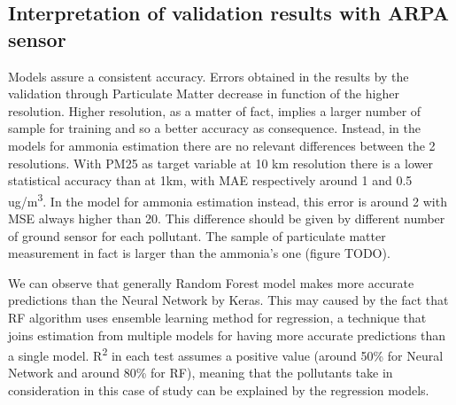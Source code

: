\subsection{Interpretation of validation results with ARPA sensor}
Models assure a consistent accuracy.
Errors obtained in the results by the validation through Particulate Matter decrease in function of the higher resolution.
Higher resolution, as a matter of fact, implies a larger number of sample for training and so a better accuracy as consequence.
Instead, in the models for ammonia estimation there are no relevant differences between the 2 resolutions.
With PM25 as target variable at 10 km resolution there is a lower statistical accuracy than at 1km, with MAE respectively around 1 and 0.5 ug/m\textsuperscript{3}. 
In the model for ammonia estimation instead, this error is around 2 with MSE always higher than 20. 
This difference should be given by different number of ground sensor for each pollutant. The sample of particulate matter measurement in fact is larger than the ammonia's one (figure TODO).
\par
We can observe that generally Random Forest model makes more accurate predictions than the Neural Network by Keras. This may caused by the fact that RF algorithm uses ensemble learning method for regression, a technique that joins estimation from multiple models for having more accurate predictions than a single model. 
R\textsuperscript{2} in each test assumes a positive value (around 50\% for Neural Network and around 80\% for RF), meaning that the pollutants take in consideration in this case of study can be explained by the regression models. 
